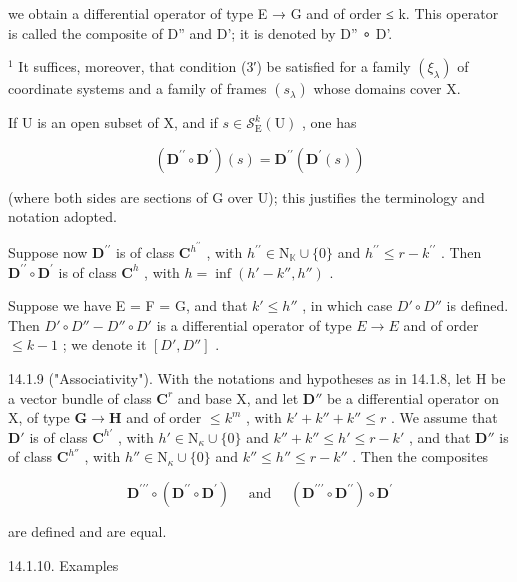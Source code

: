 we obtain a differential operator of type E → G and of order ≤ k. This operator is called the composite of D'' and D'; it is denoted by D'' ∘ D'.

\(^{1}\) It suffices, moreover, that condition (3′) be satisfied for a family \((\xi_{\lambda})\) of coordinate systems and a family of frames \((s_{\lambda})\) whose domains cover X.

If U is an open subset of X, and if \(s \in \mathcal{S}_{\mathrm{E}}^{k}(\mathrm{U})\) , one has

\[
(\mathbf {D} ^ {\prime \prime} \circ \mathbf {D} ^ {\prime}) (s) = \mathbf {D} ^ {\prime \prime} (\mathbf {D} ^ {\prime} (s))
\]

(where both sides are sections of G over U); this justifies the terminology and notation adopted.

Suppose now \(\mathbf{D}^{\prime \prime}\) is of class \(\mathbf{C}^{h^{\prime \prime}}\) , with \(h^{\prime \prime} \in \mathrm{N}_{\mathbb{K}} \cup \{0\}\) and \(h^{\prime \prime} \leqslant r-k^{\prime\prime}\) . Then \(\mathbf{D}^{\prime \prime} \circ \mathbf{D}^{\prime}\) is of class \(\mathbf{C}^{h}\) , with \(h=\inf(h'-k'',h'')\) .

Suppose we have E = F = G, and that \(k' \leqslant h''\) , in which case \(D' \circ D''\) is defined. Then \(D' \circ D'' - D'' \circ D'\) is a differential operator of type \(E \to E\) and of order \(\leqslant k - 1\) ; we denote it \([D', D'']\) .

14.1.9 ("Associativity"). With the notations and hypotheses as in 14.1.8, let H be a vector bundle of class \(\mathbf{C}^r\) and base X, and let \(\mathbf{D}''\) be a differential operator on X, of type \(\mathbf{G} \to \mathbf{H}\) and of order \(\leqslant k^{m}\) , with \(k' + k'' + k'' \leqslant r\) . We assume that \(\mathbf{D}'\) is of class \(\mathbf{C}^{h'}\) , with \(h' \in \mathrm{N}_{\kappa} \cup \{0\}\) and \(k'' + k'' \leqslant h' \leqslant r - k'\) , and that \(\mathbf{D}''\) is of class \(\mathbf{C}^{h''}\) , with \(h'' \in \mathrm{N}_{\kappa} \cup \{0\}\) and \(k'' \leqslant h'' \leqslant r - k''\) . Then the composites

\[
\mathbf {D} ^ {\prime \prime \prime} \circ (\mathbf {D} ^ {\prime \prime} \circ \mathbf {D} ^ {\prime}) \quad \text { and } \quad (\mathbf {D} ^ {\prime \prime \prime} \circ \mathbf {D} ^ {\prime \prime}) \circ \mathbf {D} ^ {\prime}
\]

are defined and are equal.

14.1.10. Examples

